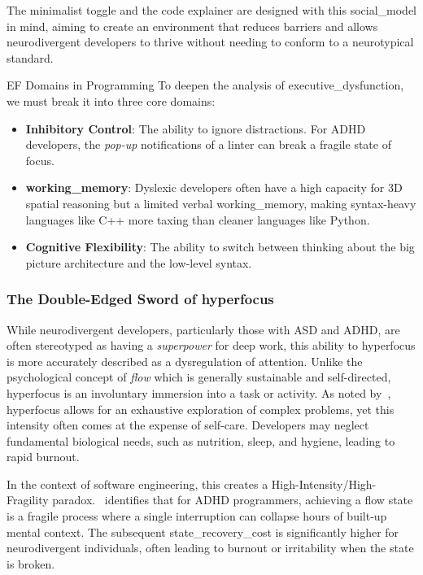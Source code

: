 The minimalist toggle and the code explainer are designed with this \gls{social_model} in mind, aiming to create an environment that reduces barriers and allows \gls{neurodivergent} developers to thrive 
without needing to conform to a neurotypical standard.

\Gls{EF} Domains in Programming
To deepen the analysis of \gls{executive_dysfunction}, we must break it into three core domains:
\begin{itemize}
    \item \textbf{Inhibitory Control}: The ability to ignore distractions. For \gls{ADHD} developers, the \textit{pop-up} notifications of a linter can break a fragile state of focus.
    \item \textbf{\Gls{working_memory}}: Dyslexic developers often have a high capacity for 3D spatial reasoning but a limited verbal \gls{working_memory}, making syntax-heavy languages like C++ more taxing than cleaner languages like Python.
    \item \textbf{Cognitive Flexibility}: The ability to switch between thinking about the big picture architecture and the low-level syntax.
\end{itemize}

\subsubsection{The Double-Edged Sword of \Gls{hyperfocus}}
While \gls{neurodivergent} developers, particularly those with \gls{ASD} and \gls{ADHD}, are often stereotyped as having a \textit{superpower} for deep work, 
this ability to \gls{hyperfocus} is more accurately described as a dysregulation of attention. Unlike the psychological concept of \textit{flow} which is
 generally sustainable and self-directed, \gls{hyperfocus} is an involuntary immersion into a task or activity. As noted by~\textcite{gama2025socio}, \gls{hyperfocus} allows 
for an exhaustive exploration of complex problems, yet this intensity often comes at the expense of self-care. Developers may neglect fundamental 
biological needs, such as nutrition, sleep, and hygiene, leading to rapid burnout. 

In the context of software engineering, this creates a High-Intensity/High-Fragility paradox.~\textcite{newman2025get} identifies that for \gls{ADHD} programmers, achieving a flow state is a fragile process where a single interruption can collapse hours of built-up mental context. The subsequent \gls{state_recovery_cost} is significantly higher 
for \gls{neurodivergent} individuals, often leading to burnout or irritability when the state is broken.


